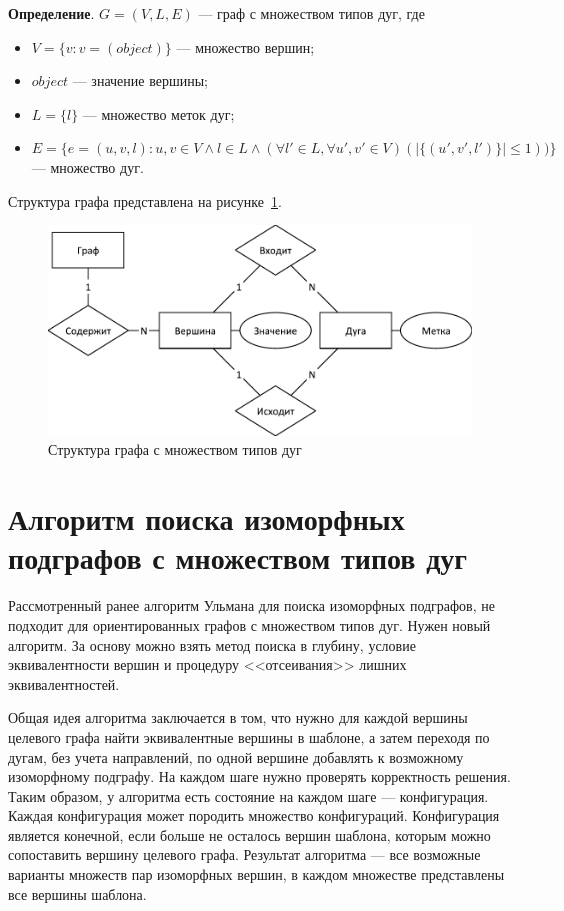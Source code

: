 \textbf{Определение}. $G = ( V, L, E )$ --- граф с множеством типов дуг, где
\begin{itemize}
\item $V = \{ v : v = (object) \}$ --- множество вершин;
\item $object$ --- значение вершины;
\item $L = \{ l \}$ --- множество меток дуг;
\item $E = \{ e = (u, v, l) :  u, v \in V \land l \in L \land ( \forall l' \in L, \forall u', v' \in V) ( | \{ (u', v', l') \} | \le 1 ) ) \}$ --- множество дуг.
\end{itemize}

Структура графа представлена на рисунке~\ref{fig:graph}.

\begin{figure}[!ht]
\centering
\includegraphics[width=\textwidth]{inc/graph.pdf}
\caption{Структура графа с множеством типов дуг}
\label{fig:graph}
\end{figure}

\section{Алгоритм поиска изоморфных подграфов с множеством типов дуг}

Рассмотренный ранее алгоритм Ульмана для поиска изоморфных подграфов,
не подходит для ориентированных графов с множеством типов дуг.
Нужен новый алгоритм.
За основу можно взять метод поиска в глубину, условие эквивалентности вершин
и процедуру <<отсеивания>> лишних эквивалентностей.

Общая идея алгоритма заключается в том,
что нужно для каждой вершины целевого графа найти эквивалентные вершины в шаблоне,
а затем переходя по дугам, без учета направлений,
по одной вершине добавлять к возможному изоморфному подграфу.
На каждом шаге нужно проверять корректность решения.
Таким образом, у алгоритма есть состояние на каждом шаге --- конфигурация.
Каждая конфигурация может породить множество конфигураций.
Конфигурация является конечной, если больше не осталось вершин шаблона,
которым можно сопоставить вершину целевого графа.
Результат алгоритма --- все возможные варианты множеств пар изоморфных вершин,
в каждом множестве представлены все вершины шаблона.


